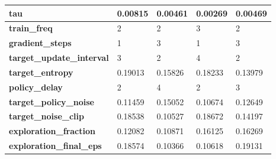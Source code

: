 \documentclass[../xlapes02]{subfiles}
\begin{document}
\begin{table}[!ht]
\begin{tabular}{|l||l|l||l|l|}
            \textbf{tau}                       & 0.00815                                      & 0.00461                                      & 0.00269                                      & 0.00469                                      \\ \hline
            \textbf{train\_freq}               & 2                                            & 2                                            & 3                                            & 2                                            \\ \hline
            \textbf{gradient\_steps}           & 1                                            & 3                                            & 1                                            & 3                                            \\ \hline
            \textbf{target\_update\_interval}  & 3                                            & 2                                            & 4                                            & 2                                            \\ \hline
            \textbf{target\_entropy}           & 0.19013                                      & 0.15826                                      & 0.18233                                      & 0.13979                                      \\ \hline
            \textbf{policy\_delay}             & 2                                            & 4                                            & 2                                            & 3                                            \\ \hline
            \textbf{target\_policy\_noise}     & 0.11459                                      & 0.15052                                      & 0.10674                                      & 0.12649                                      \\ \hline
            \textbf{target\_noise\_clip}       & 0.18538                                      & 0.10527                                      & 0.18672                                      & 0.14197                                      \\ \hline
            \textbf{exploration\_fraction}     & 0.12082                                      & 0.10871                                      & 0.16125                                      & 0.16269                                      \\ \hline
            \textbf{exploration\_final\_eps}   & 0.18574                                      & 0.10366                                      & 0.10618                                      & 0.19131                                      \\ \hline

\end{tabular}
\end{table}
\end{document}
